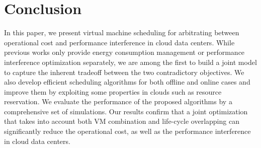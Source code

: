 \documentclass[10pt,journal]{IEEEtran}
\begin{document}
\section{Conclusion}
\label{sec:conclusion}
In this paper, we present virtual machine scheduling for arbitrating between operational cost and performance interference in cloud data centers. While previous works only provide energy consumption management or performance interference optimization separately, we are among the first to build a joint model to capture the inherent tradeoff between the two contradictory objectives. We also develop efficient scheduling algorithms for both offline and online cases and improve them by exploiting some properties in clouds such as resource reservation. We evaluate the performance of the proposed algorithms by a comprehensive set of simulations. Our results confirm that a joint optimization that takes into account both VM combination and life-cycle overlapping can significantly reduce the operational cost, as well as the performance interference in cloud data centers.
\end{document}
